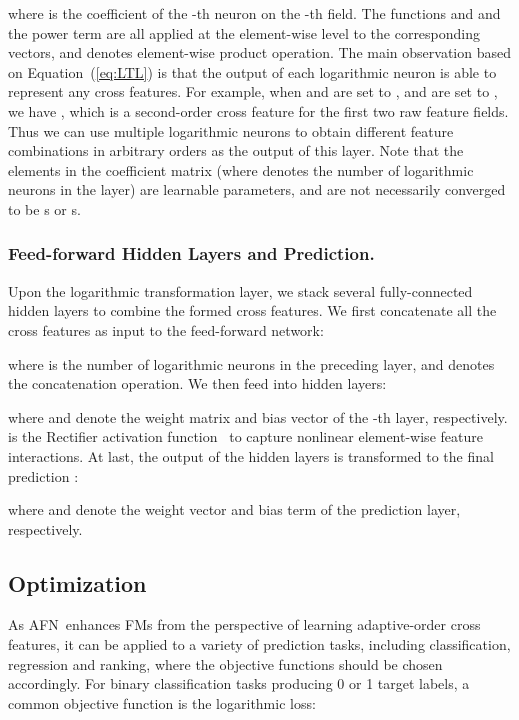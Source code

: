 \documentclass[letterpaper]{article} \usepackage{aaai20}  \usepackage{times}  \usepackage{helvet} \usepackage{courier}  \usepackage[hyphens]{url}  \usepackage{graphicx} \urlstyle{rm} \def\UrlFont{\rm}  \usepackage{graphicx}  \frenchspacing  \setlength{\pdfpagewidth}{8.5in}  \setlength{\pdfpageheight}{11in}
\newcommand{\model}{{AFN}~}
\begin{document}
where  is the coefficient of the -th neuron on the -th field. The functions  and  and the power term  are all applied at the element-wise level to the corresponding vectors, and  denotes element-wise product operation.
The main observation based on Equation~(\ref{eq:LTL}) is that the output of each logarithmic neuron  is able to represent any cross features. For example, when  and  are set to , and  are set to , we have , which is a second-order cross feature for the first two raw feature fields.
Thus we can use multiple logarithmic neurons to obtain different feature combinations in arbitrary orders as the output of this layer.
Note that the elements in the coefficient matrix  (where  denotes the number of logarithmic neurons in the layer) are learnable parameters, and are not necessarily converged to be s or s.  

\subsubsection{Feed-forward Hidden Layers and Prediction.}

Upon the logarithmic transformation layer, we stack several fully-connected hidden layers to combine the formed cross features. We first concatenate all the cross features as input to the feed-forward network:

where  is the number of logarithmic neurons in the preceding layer, and  denotes the concatenation operation. We then feed  into  hidden layers:

where  and  denote the weight matrix and bias vector of the -th layer, respectively.  is the Rectifier activation function~\cite{Relu} to capture nonlinear element-wise feature interactions.
At last, the output  of the hidden layers is transformed to the final prediction :

where  and  denote the weight vector and bias term of the prediction layer, respectively.

\subsection{Optimization}

As \model enhances FMs from the perspective of learning adaptive-order cross features, it can be applied to a variety of prediction tasks, including classification, regression and ranking, where the objective functions should be chosen accordingly.  
For binary classification tasks producing 0 or 1 target labels, a common objective function is the logarithmic loss:
\small
 
\end{document}
